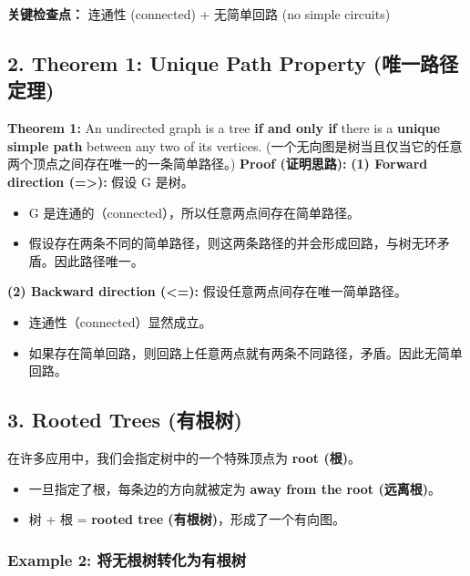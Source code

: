 \documentclass[10pt,a4paper,openany]{ctexbook}
\theoremstyle{definition}
\theoremstyle{remark}
\renewenvironment{quote}
  {\list{}{\leftmargin=1em\rightmargin=0pt\topsep=0.5pt\partopsep=0pt}\item[]}
  {\endlist}
\begin{document}
\begin{quote}
\textbf{关键检查点：} 连通性 (connected) + 无简单回路 (no simple circuits)

\end{quote}
\vspace{-2pt}

\subsection{2. Theorem 1: Unique Path Property (唯一路径定理)}

\textbf{Theorem 1:} An undirected graph is a tree \textbf{if and only if} there is a \textbf{unique simple path} between any two of its vertices.
(一个无向图是树当且仅当它的任意两个顶点之间存在唯一的一条简单路径。)
\textbf{Proof (证明思路):}
\textbf{(1) Forward direction (=>):} 假设 G 是树。
\begin{itemize}
\item G 是连通的（connected），所以任意两点间存在简单路径。
\item 假设存在两条不同的简单路径，则这两条路径的并会形成回路，与树无环矛盾。因此路径唯一。

\end{itemize}

\textbf{(2) Backward direction (<=):} 假设任意两点间存在唯一简单路径。
\begin{itemize}
\item 连通性（connected）显然成立。
\item 如果存在简单回路，则回路上任意两点就有两条不同路径，矛盾。因此无简单回路。

\end{itemize}

\vspace{-2pt}

\subsection{3. Rooted Trees (有根树)}

在许多应用中，我们会指定树中的一个特殊顶点为 \textbf{root (根)}。
\begin{itemize}
\item 一旦指定了根，每条边的方向就被定为 \textbf{away from the root (远离根)}。
\item 树 + 根 = \textbf{rooted tree (有根树)}，形成了一个有向图。

\end{itemize}

\subsubsection{Example 2: 将无根树转化为有根树}
\end{document}
